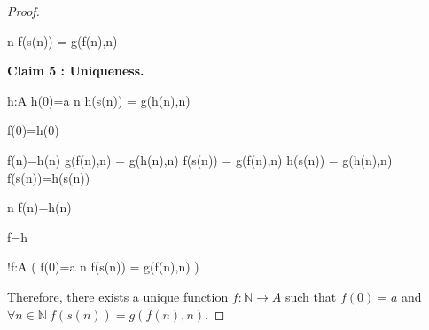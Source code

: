 \documentclass[10pt,a4paper]{book}
\begin{document}
\begin{proof}
\begin{fitchproof}[arrayenv=tabular]
         {\forall n\in{} \quad    f(s(n))   =  g(f(n),n)}

    \end{fitchproof}



    \textbf{Claim 5 : Uniqueness.}

    \begin{fitchproof}[arrayenv=tabular]

        \open
         {h:\to A}
         {h(0)=a}
         {\forall n\in{}
            \quad
            h(s(n))
            =
            g(h(n),n)}

         {f(0)=h(0)}

        \open
         {f(n)=h(n)}
         {g(f(n),n) = g(h(n),n) }
         {f(s(n)) = g(f(n),n)}
         {h(s(n)) = g(h(n),n)}
         {f(s(n))=h(s(n))}
        \close

         {\forall n\in{}
            \quad
            f(n)=h(n)}

         {f=h}
        \close

         {\exists !f:\to A
            \quad
            \Big(
            f(0)=a
            \land
            \forall n\in{}
            \quad
            f(s(n))
            =
            g(f(n),n)
            \Big)}

    \end{fitchproof}



    Therefore, there exists a unique function $f : \mathbb{N} \to A$ such that
    $f(0) = a$ and $\forall n \in \mathbb{N} \ f(s(n)) = g(f(n),n)$.
\end{proof}
\end{document}
